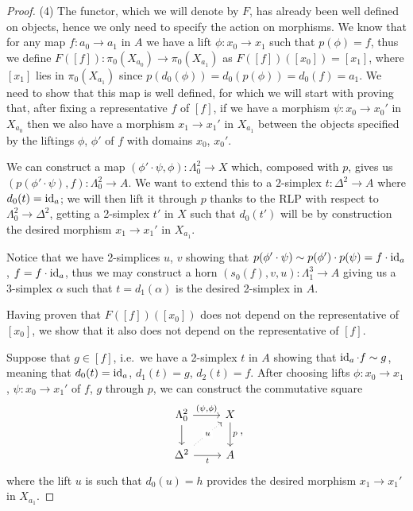 \documentclass[a4paper,11pt,openany]{scrartcl}
\begin{document}
\begin{proof}
    (4) The functor, which we will denote by $F$, has already been well defined
    on objects, hence we only need to specify the action on morphisms. We know
    that for any map $f\colon a_0\rightarrow a_1$ in $A$ we have a lift
    $\phi\colon x_0\rightarrow x_1$ such that $p(\phi)=f$, thus we define
    $F([f])\colon\pi_0(X_{a_0})\rightarrow\pi_0(X_{a_1})$ as
    $F([f])([x_0])=[x_1]$, where $[x_1]$ lies in $\pi_0(X_{a_1})$ since
    $p(d_0(\phi))=d_0(p(\phi))=d_0(f)=a_1$.
    We need to show that this map is well defined, for which we will start with
    proving that, after fixing a representative $f$ of $[f]$, if we have a
    morphism $\psi\colon x_0\rightarrow x_0'$ in $X_{a_0}$ then we also have a
    morphism $x_1\rightarrow x_1'$ in $X_{a_1}$ between the objects specified by
    the liftings $\phi$, $\phi'$ of $f$ with domains $x_0$, $x_0'$.

    We can construct a map
    $(\phi'\cdot\psi,\phi)\colon\Lambda^2_0\rightarrow X$ which, composed
    with $p$, gives us $(p(\phi'\cdot\psi),f)\colon\Lambda^2_0\rightarrow A$. We
    want to extend this to a $2$-simplex $t\colon\Delta^2\rightarrow A$ where
    $d_0(t)=\operatorname{id}_a$; we will then lift it through $p$ thanks to the RLP with
    respect to $\Lambda^2_0\rightarrow\Delta^2$, getting a 2-simplex $t'$ in $X$
    such that $d_0(t')$ will be by construction the desired morphism
    $x_1\rightarrow x_1'$ in $X_{a_1}$.

    Notice that we have 2-simplices $u$, $v$ showing that $p(\phi'\cdot\psi)\sim
    p(\phi')\cdot p(\psi)=f\cdot\operatorname{id}_a$, $f=f\cdot\operatorname{id}_a$, thus we may construct
    a horn $(s_0(f),v,u)\colon\Lambda^3_1\rightarrow A$ giving us a 3-simplex
    $\alpha$ such that $t=d_1(\alpha)$ is the desired 2-simplex in $A$.

    Having proven that $F([f])([x_0])$ does not depend on the representative of
    $[x_0]$, we show that it also does not depend on the representative of
    $[f]$.

    Suppose that $g\in [f]$, i.e.\ we have a 2-simplex $t$ in $A$ showing that
    $\operatorname{id}_a\cdot f\sim g$, meaning that $d_0(t)=\operatorname{id}_a$, $d_1(t)=g$, $d_2(t)=f$.
    After choosing lifts $\phi\colon x_0\rightarrow x_1$, $\psi\colon
    x_0\rightarrow x_1'$ of $f$, $g$ through $p$, we can construct the
    commutative square
    \[\begin{tikzcd}
        {\Lambda^2_0} & X \\
        {\Delta^2} & A
        \arrow["{(\psi,\phi)}", from=1-1, to=1-2]
        \arrow[from=1-1, to=2-1]
        \arrow["t"', from=2-1, to=2-2]
        \arrow["p", from=1-2, to=2-2]
        \arrow["u"{description}, dotted, from=2-1, to=1-2]
    \end{tikzcd},\]
    where the lift $u$ is such that $d_0(u)=h$ provides the desired morphism
    $x_1\rightarrow x_1'$ in $X_{a_1}$.


\end{proof}
\end{document}
